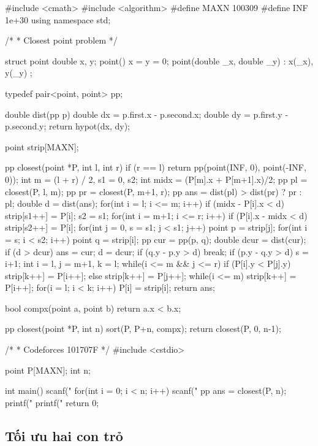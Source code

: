 \documentclass[11pt]{article}
\begin{document}
\begingroup\scriptsize
\begin{vncode}
#include <cmath>
#include <algorithm>
#define MAXN 100309
#define INF 1e+30
using namespace std;

/*
 * Closest point problem
 */

struct point {
    double x, y;
    point() { x = y = 0; }
    point(double _x, double _y) : x(_x), y(_y) {}
};

typedef pair<point, point> pp;

double dist(pp p) {
	double dx = p.first.x - p.second.x;
	double dy = p.first.y - p.second.y;
	return hypot(dx, dy);
}

point strip[MAXN];

pp closest(point *P, int l, int r) {
	if (r == l) return pp(point(INF, 0), point(-INF, 0));
	int m = (l + r) / 2, s1 = 0, s2;
	int midx = (P[m].x + P[m+1].x)/2;
	pp pl = closest(P, l, m);
	pp pr = closest(P, m+1, r);
	pp ans = dist(pl) > dist(pr) ? pr : pl;
	double d = dist(ans);
	for(int i = l; i <= m; i++) {
		if (midx - P[i].x < d) strip[s1++] = P[i];
	}
	s2 = s1;
	for(int i = m+1; i <= r; i++) {
		if (P[i].x - midx < d) strip[s2++] = P[i];
	}
	for(int j = 0, s = s1; j < s1; j++) {
		point p = strip[j];
		for(int i = s; i < s2; i++) {
			point q = strip[i];
			pp cur = pp(p, q);
			double dcur = dist(cur);
			if (d > dcur) {
				ans = cur; d = dcur;
			}
			if (q.y - p.y > d) break;
			if (p.y - q.y > d) s = i+1;
		}
	}
	int i = l, j = m+1, k = l;
	while(i <= m && j <= r) {
		if (P[i].y < P[j].y) strip[k++] = P[i++];
		else strip[k++] = P[j++];
	}
	while(i <= m) strip[k++] = P[i++];
	for(i = l; i < k; i++) P[i] = strip[i];
	return ans;
}

bool compx(point a, point b) {
    return a.x < b.x;
}

pp closest(point *P, int n){
	sort(P, P+n, compx);
	return closest(P, 0, n-1);
}

/*
 * Codeforces 101707F
 */
#include <cstdio>

point P[MAXN];
int n;

int main() {
	scanf("%
	for(int i = 0; i < n; i++) scanf("%
	pp ans = closest(P, n);
	printf("%
	printf("%
	return 0;
}
\end{vncode}
\endgroup


\subsection{Tối ưu hai con trỏ}
\end{document}
